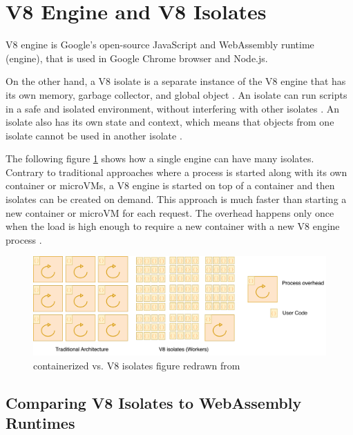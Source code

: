 \section{V8 Engine and V8 Isolates}
\label{sec:v8-comparison}

\gls{V8} engine is Google's open-source JavaScript and WebAssembly runtime (engine), that is used in Google Chrome browser and Node.js.

On the other hand, a V8 isolate is a separate instance of the V8 engine that has its own memory, garbage collector, and global object \cite{a2021_isolate}. An isolate can run scripts in a safe and isolated environment, without interfering with other isolates \cite{cloudflareinc_2023_how}. An isolate also has its own state and context, which means that objects from one isolate cannot be used in another isolate \cite{a2021_isolate}.

The following figure \ref{fig:v8-isolates} shows how a single engine can have many isolates. Contrary to traditional approaches where a process is started along with its own container or microVMs, a \gls{V8} engine is started on top of a container and then isolates can be created on demand. This approach is much faster than starting a new container or microVM for each request. The overhead happens only once when the load is high enough to require a new container with a new V8 engine process \cite{cloudflareinc_2023_how}.

\begin{figure}[H]
	\centering
		\includegraphics[width=\textwidth,height=\textheight,keepaspectratio]{images/runtimes/v8-isolates.pdf}
	\caption{containerized vs. \gls{V8} \glspl{isolate} figure redrawn from \cite{cloudflareinc_2023_how}}
	\label{fig:v8-isolates}
\end{figure}

\subsection{Comparing V8 Isolates to WebAssembly Runtimes}

